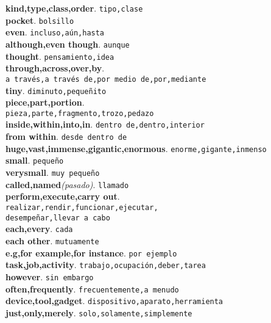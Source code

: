 \documentclass[twocolumn]{article}
\begin{document}
	\textsf{\textbf{kind,type,class,order}}. \texttt{tipo,clase}\\
	\textsf{\textbf{pocket}}. \texttt{bolsillo}\\
	\textsf{\textbf{even}}. \texttt{incluso,a\'un,hasta}\\
	\textsf{\textbf{although,even though}}. \texttt{aunque}\\ 
	\textsf{\textbf{thought}}. \texttt{pensamiento,idea}\\
	\textsf{\textbf{through,across,over,by}}.\\\texttt{a trav\'es,a trav\'es de,por medio de,por,mediante}\\  
	\textsf{\textbf{tiny}}. \texttt{diminuto,peque\~nito}\\ 
	\textsf{\textbf{piece,part,portion}}.\\\texttt{pieza,parte,fragmento,trozo,pedazo}\\
	\textsf{\textbf{inside,within,into,in}}. \texttt{dentro de,dentro,interior}\\
	\textsf{\textbf{from within}}. \texttt{desde dentro de}\\
	\textsf{\textbf{huge,vast,immense,gigantic,enormous}}. \texttt{enorme,gigante,inmenso}\\
	\textsf{\textbf{small}}. \texttt{peque\~no}\\
	\textsf{\textbf{verysmall}}. \texttt{muy peque\~no}\\
	\textsf{\textbf{called,named}{\scriptsize \textsl{(pasado)}}}. \texttt{llamado}\\
	\textsf{\textbf{perform,execute,carry out}}.\\\texttt{realizar,rendir,funcionar,ejecutar,\\desempe\~nar,llevar a cabo}\\
	\textsf{\textbf{each,every}}. \texttt{cada}\\
	\textsf{\textbf{each other}}. \texttt{mutuamente}\\
	\textsf{\textbf{e.g,for example,for instance}}. \texttt{por ejemplo}\\
	\textsf{\textbf{task,job,activity}}. \texttt{trabajo,ocupaci\'on,deber,tarea}\\
	\textsf{\textbf{however}}. \texttt{sin embargo}\\
	\textsf{\textbf{often,frequently}}. \texttt{frecuentemente,a menudo}\\
	\textsf{\textbf{device,tool,gadget}}. \texttt{dispositivo,aparato,herramienta}\\
	\textsf{\textbf{just,only,merely}}. \texttt{solo,solamente,simplemente}\\
\end{document}

